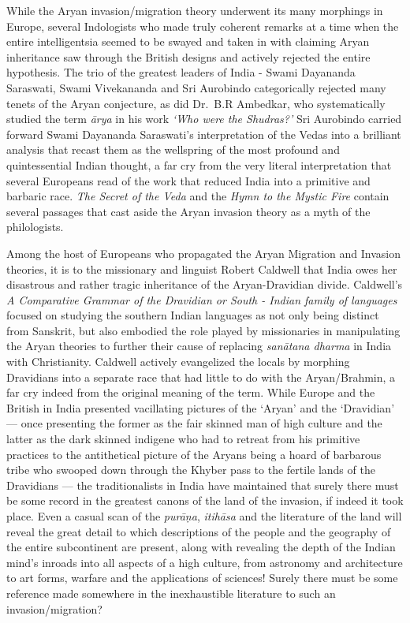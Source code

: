 While the Aryan invasion/migration theory underwent its many morphings in Europe, several Indologists who made truly coherent remarks at a time when the entire intelligentsia seemed to be swayed and taken in with claiming Aryan inheritance saw through the British designs and actively rejected the entire hypothesis. The trio of the greatest leaders of India - Swami Dayananda Saraswati, Swami Vivekananda and Sri Aurobindo categorically rejected many tenets of the Aryan conjecture, as did Dr.\ B.R Ambedkar, who systematically studied the term \textit{ārya} in his work \textit{‘Who were the Shudras?’} Sri Aurobindo carried forward Swami Dayananda Saraswati’s interpretation of the Vedas into a brilliant analysis that recast them as the wellspring of the most profound and quintessential Indian thought, a far cry from the very literal interpretation that several Europeans read of the work that reduced India into a primitive and barbaric race. \textit{The Secret of the Veda} and the \textit{Hymn to the Mystic Fire} contain several passages that cast aside the Aryan invasion theory as a myth of the philologists.

Among the host of Europeans who propagated the Aryan Migration and Invasion theories, it is to the missionary and linguist Robert Caldwell that India owes her disastrous and rather tragic inheritance of the Aryan-Dravidian divide. Caldwell’s \textit{A Comparative Grammar of the Dravidian or South - Indian family of languages} focused on studying the southern Indian languages as not only being distinct from Sanskrit, but also embodied the role played by missionaries in manipulating the Aryan theories to further their cause of replacing \textit{sanātana dharma} in India with Christianity. Caldwell actively evangelized the locals by morphing Dravidians into a separate race that had little to do with the Aryan/Brahmin, a far cry indeed from the original meaning of the term. While Europe and the British in India presented vacillating pictures of the ‘Aryan’ and the ‘Dravidian’ — once presenting the former as the fair skinned man of high culture and the latter as the dark skinned indigene who had to retreat from his primitive practices to the antithetical picture of the Aryans being a hoard of barbarous tribe who swooped down through the Khyber pass to the fertile lands of the Dravidians — the traditionalists in India have maintained that surely there must be some record in the greatest canons of the land of the invasion, if indeed it took place. Even a casual scan of the \textit{purāṇa}, \textit{itihāsa} and the literature of the land will reveal the great detail to which descriptions of the people and the geography of the entire subcontinent are present, along with revealing the depth of the Indian mind’s inroads into all aspects of a high culture, from astronomy and architecture to art forms, warfare and the applications of sciences! Surely there must be some reference made somewhere in the inexhaustible literature to such an invasion/migration?

